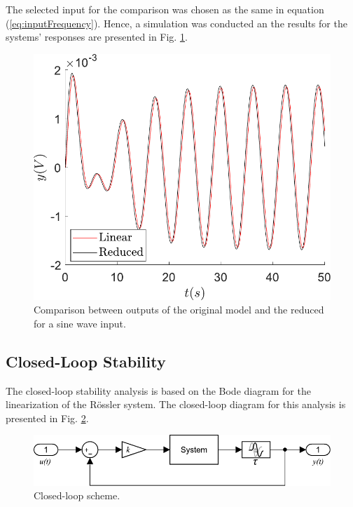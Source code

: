 The selected input for the comparison was chosen as the same in equation (\ref{eq:inputFrequency}). Hence, a simulation was conducted an the results for the systems' responses are presented in Fig. \ref{fig:sinesOutput_Reduced}.

\begin{figure}[H]
    \centering
    \includegraphics[scale=0.45]{figs/sineOutput/Comp_lin_red_seno.pdf}
    \caption{Comparison between outputs of the original model and the reduced for a sine wave input.}
    \label{fig:sinesOutput_Reduced}
\end{figure}
\subsection{Closed-Loop Stability}
The closed-loop stability analysis is based on the Bode diagram for the linearization of the Rössler system. The closed-loop diagram for this analysis is presented in Fig. \ref{fig:closedloop}. 
\begin{figure}[H]
    \centering
    \includegraphics[scale=0.65]{figs/closedLoop.pdf}
    \caption{Closed-loop scheme.}
    \label{fig:closedloop}
\end{figure}

